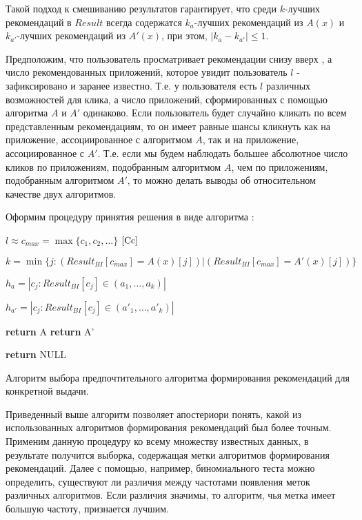 \documentclass[12pt,a4paper]{report}
\begin{document}
Такой подход к смешиванию результатов гарантирует, что среди $k$-лучших рекомендаций в $Result$ всегда содержатся $k_a$-лучших рекомендаций из $A(x)$ и $k_{a'}$-лучших рекомендаций из $A'(x)$, при этом, $|k_a-k_{a'}| \le 1$.

Предположим, что пользователь просматривает рекомендации снизу вверх \cite{Down}, а число рекомендованных приложений, которое увидит пользователь $l$ - зафиксировано и заранее известно. Т.е. у пользователя есть $l$ различных возможностей для клика, а число приложений, сформированных с помощью алгоритма $A$ и $A'$ одинаково. Если пользователь будет случайно кликать по всем представленным рекомендациям, то он имеет равные шансы кликнуть как на приложение, ассоциированное с алгоритмом $A$, так и на приложение, ассоциированное с $A'$. Т.е. если мы будем наблюдать большее абсолютное число кликов по приложениям, подобранным алгоритмом $A$, чем по приложениям, подобранным алгоритмом $A'$, то можно делать выводы об относительном качестве двух алгоритмов.

Оформим процедуру принятия решения в виде алгоритма \cite{Td}:


\begin{algorithm}[H]
\SetAlgoLined
{}
$l \approx c_{max} = \max\{c_1,c_2,\dots\}$ $\cite{Cc}$

$k = \min\{j: (Result_{BI}[c_{max}] = A(x)[j]) | (Result_{BI}[c_{max}]  = A'(x)[j])\}$

$h_a = |{c_j: Result_{BI}[c_j] \in (a_1, \dots, a_k)}|$

$h_{a'} = |{c_j: Result_{BI}[c_j] \in (a'_1, \dots, a'_k)}|$

 {
\textbf{return} A
}
 {
\textbf{return} A'
}

\textbf{return} NULL

\caption{Алгоритм выбора предпочтительного алгоритма формирования рекомендаций для конкретной выдачи.}
\label{alg:CBI}
\end{algorithm}

Приведенный выше алгоритм позволяет апостериори понять, какой из использованных алгоритмов формирования рекомендаций был более точным.
Применим данную процедуру ко всему множеству известных данных, в результате получится выборка, содержащая метки алгоритмов формирования рекомендаций. Далее с помощью, например, биномиального теста можно определить, существуют ли различия между частотами появления меток различных алгоритмов. Если различия значимы, то алгоритм, чья метка имеет большую частоту, признается лучшим.
\end{document}
